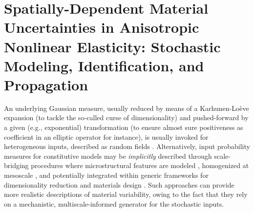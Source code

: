\chapter{Spatially-Dependent Material Uncertainties in Anisotropic Nonlinear Elasticity: Stochastic Modeling, Identification, and Propagation}
\label{chap:artery}

An underlying Gaussian measure, usually reduced by means of a Karhunen-Lo\`{e}ve expansion (to tackle the so-called curse of dimensionality) and pushed-forward by a given (e.g., exponential) transformation (to ensure almost sure positiveness as coefficient in an elliptic operator for instance), is usually invoked for heterogeneous inputs, described as random fields \cite{Ghanem1991,Ghanem2017}. Alternatively, input probability measures for constitutive models may be \textit{implicitly} described through scale-bridging procedures where microstructural features are modeled \cite{Sobczyk,Torquato}, homogenized at mesoscale \cite{OstojaBook, ostoja1998, baxter2001a, baxter2001b, STEFANOU2017319}, and potentially integrated within generic frameworks for dimensionality reduction \cite{BESSA2017633} and materials design \cite{Yin2009}. Such approaches can provide more realistic descriptions of material variability, owing to the fact that they rely on a mechanistic, multiscale-informed generator for the stochastic inputs.

